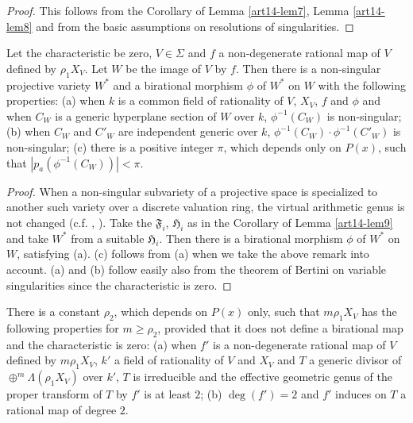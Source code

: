 \begin{proof}
This follows from the Corollary of Lemma \ref{art14-lem7}, Lemma \ref{art14-lem8} and from the basic assumptions on resolutions of singularities.
\end{proof}

\begin{lemma}\label{art14-lem10}
Let the characteristic be zero, $V\in\Sigma$ and $f$ a non-degenerate rational map of $V$ defined by $\rho_{1}X_{V}$. Let $W$ be the image of $V$ by $f$. Then there is a non-singular projective variety $W^{*}$ and a birational morphism $\phi$ of $W^{*}$ on $W$ with the following properties: {\rm(a)} when $k$ is a common field of rationality of $V$, $X_{V}$, $f$ and $\phi$ and when $C_{W}$ is a generic hyperplane section of $W$ over $k$, $\phi^{-1}(C_{W})$ is non-singular; {\rm(b)} when $C_{W}$ and $C'_{W}$ are independent generic over $k$, $\phi^{-1}(C_{W})\cdot \phi^{-1}(C'_{W})$ is non-singular; {\rm(c)} there is a positive integer $\pi$, which depends only on $P(x)$, such that $|p_{a}(\phi^{-1}(C_{W}))|<\pi$.
\end{lemma}

\begin{proof}
When a non-singular subvariety of a projective space is specialized to another such variety over a discrete valuation ring, the virtual arithmetic genus is not changed (c.f. \cite{art14-key2}, \cite{art14-key4}). Take the $\mathfrak{F}_{i}$, $\mathfrak{H}_{i}$ as in the Corollary of Lemma \ref{art14-lem9} and take $W^{*}$ from a suitable $\mathfrak{H}_{i}$. Then there is a birational morphism $\phi$ of $W^{*}$ on $W$, satisfying (a). (c) follows from (a) when we take the above remark into account. (a) and (b) follow easily also from the theorem of Bertini on variable singularities since the characteristic is zero.
\end{proof}

\begin{lemma}\label{art14-lem11}
There is a constant $\rho_{2}$, which depends on $P(x)$ only, such that $m\rho_{1}X_{V}$ has the following properties for $m\geq \rho_{2}$, provided that it does not define a birational map and the characteristic is zero: {\rm(a)} when $f'$ is a non-degenerate rational map of $V$ defined by $m\rho_{1}X_{V}$, $k'$ a field of rationality of $V$ and $X_{V}$ and $T$ a generic divisor of\pageoriginale $\oplus^{m}\Lambda(\rho_{1}X_{V})$ over $k'$, $T$ is irreducible and the effective geometric genus of the proper transform of $T$ by $f'$ is at least $2$; {\rm(b)} $\deg (f')=2$ and $f'$ induces on $T$ a rational map of degree $2$.
\end{lemma}

